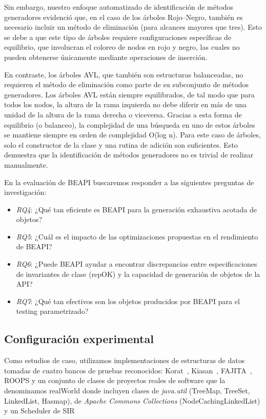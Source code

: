 Sin embargo, nuestro enfoque automatizado de identificación de métodos generadores evidenció que, 
en el caso de los árboles Rojo–Negro, también es necesario incluir un método de eliminación 
(para alcances mayores que tres).  
Esto se debe a que este tipo de árboles requiere configuraciones específicas de equilibrio, 
que involucran el coloreo de nodos en rojo y negro, las cuales no pueden obtenerse únicamente 
mediante operaciones de inserción.

En contraste, los árboles AVL,
que también son estructuras balanceadas, no requieren el método de eliminación como parte de su subconjunto de métodos generadores.
Los árboles AVL están siempre equilibrados, 
de tal modo que para todos los nodos, la altura de la rama izquierda no debe diferir en más de una unidad de la altura de la rama derecha o viceversa. 
Gracias a esta forma de equilibrio (o balanceo), la complejidad de una búsqueda en uno de estos árboles se mantiene siempre en orden de complejidad O(log n). 
Para este caso de árboles, solo el constructor de la clase y una rutina de adición son suficientes. 
Esto demuestra que la identificación de métodos generadores no es trivial de realizar manualmente.




En la evaluación de BEAPI buscaremos responder a las siguientes preguntas de
investigación:

\begin{itemize}
\item \emph{RQ4}: ¿Qué tan eficiente es BEAPI para la generación exhaustiva                                                                                       
    acotada de objetos?
\item\emph{RQ5}: ¿Cuál es el impacto de las optimizaciones propuestas en el
    rendimiento de BEAPI?
\item\emph{RQ6}: ¿Puede BEAPI ayudar a encontrar discrepancias entre
    especificaciones de invariantes de clase (repOK) y la capacidad de generación de objetos de la API?
\item\emph{RQ7}: ¿Qué tan efectivos son los objetos producidos por BEAPI para el
    testing parametrizado?  
\end{itemize}

\subsection{Configuración experimental}

Como estudios de caso, utilizamos implementaciones de estructuras de datos tomadas de cuatro bancos 
de pruebas reconocidos: \textsf{Korat}~\cite{Boyapati02}, \textsf{Kiasan}~\cite{Deng06}, 
\textsf{FAJITA}~\cite{Abad13}, \textsf{ROOPS} y un conjunto de clases de proyectos reales de software que la denominamos \textsf{realWorld}
donde incluyen clases de \emph{java.util} (TreeMap, TreeSet, LinkedList, Hasmap), de \emph{Apache Commons Collections} (NodeCachingLinkedList) y un Scheduler de SIR

